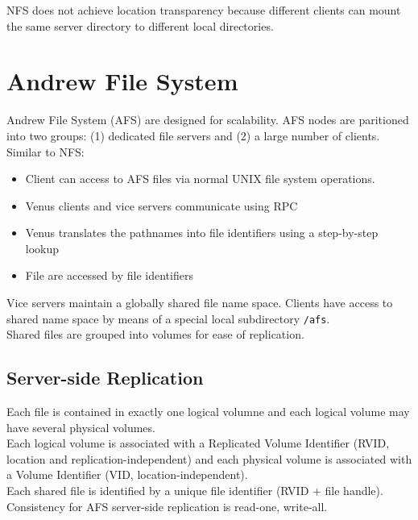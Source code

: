 \begin{multicols*}{2}
\noindent NFS does not achieve location transparency because different clients can mount the same server directory to different local directories. 

\section{Andrew File System}

\noindent Andrew File System (AFS) are designed for scalability. AFS nodes are paritioned into two groups: (1) dedicated file servers and (2) a large number of clients. \\

\noindent Similar to NFS: 
\begin{itemize}
    \item Client can access to AFS files via normal UNIX file system operations.
    \item Venus clients and vice servers communicate using RPC
    \item Venus translates the pathnames into file identifiers using a step-by-step lookup
    \item File are accessed by file identifiers
\end{itemize}

\noindent Vice servers maintain a globally shared file name space. Clients have access to shared name space by means of a special local subdirectory \verb|/afs|. \\

\noindent Shared files are grouped into volumes for ease of replication.

\subsection{Server-side Replication}

\noindent Each file is contained in exactly one logical volumne and each logical volume may have several physical volumes. \\

\noindent Each logical volume is associated with a Replicated Volume Identifier (RVID, location and replication-independent) and each physical volume is associated with a Volume Identifier (VID, location-independent).\\

\noindent Each shared file is identified by a unique file identifier (RVID + file handle). \\

\noindent Consistency for AFS server-side replication is read-one, write-all. 


\end{multicols*}
